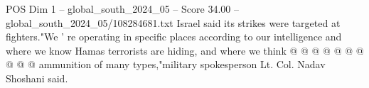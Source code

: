 \begin{textsample}{POS Dim 1 – global\_south\_2024\_05 – Score 34.00 – global\_south\_2024\_05/108284681.txt}
Israel said its strikes were targeted at fighters."We ' re operating in specific places according to our intelligence and where we know Hamas terrorists are hiding, and where we think @ @ @ @ @ @ @ @ @ @ ammunition of many types,"military spokesperson Lt.
Col.
Nadav Shoshani said.

\end{textsample}
